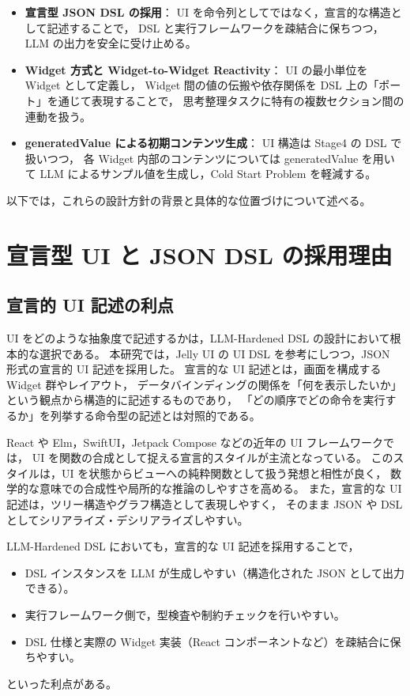 \documentclass[senior,final,11pt,dvipdfmx]{iputit-thesis}
\begin{document}
\begin{itemize}
  \item \textbf{宣言型 JSON DSL の採用}：
        UI を命令列としてではなく，宣言的な構造として記述することで，
        DSL と実行フレームワークを疎結合に保ちつつ，
        LLM の出力を安全に受け止める。
  \item \textbf{Widget 方式と Widget-to-Widget Reactivity}：
        UI の最小単位を Widget として定義し，
        Widget 間の値の伝搬や依存関係を DSL 上の「ポート」を通じて表現することで，
        思考整理タスクに特有の複数セクション間の連動を扱う。
  \item \textbf{generatedValue による初期コンテンツ生成}：
        UI 構造は Stage4 の DSL で扱いつつ，
        各 Widget 内部のコンテンツについては generatedValue を用いて
        LLM によるサンプル値を生成し，Cold Start Problem を軽減する。
\end{itemize}

以下では，これらの設計方針の背景と具体的な位置づけについて述べる。

\section{宣言型 UI と JSON DSL の採用理由}

\subsection{宣言的 UI 記述の利点}

UI をどのような抽象度で記述するかは，LLM-Hardened DSL の設計において根本的な選択である。
本研究では，Jelly UI の UI DSL を参考にしつつ，JSON 形式の宣言的 UI 記述を採用した。
宣言的な UI 記述とは，画面を構成する Widget 群やレイアウト，
データバインディングの関係を「何を表示したいか」という観点から構造的に記述するものであり，
「どの順序でどの命令を実行するか」を列挙する命令型の記述とは対照的である。

React や Elm，SwiftUI，Jetpack Compose などの近年の UI フレームワークでは，
UI を関数の合成として捉える宣言的スタイルが主流となっている。
このスタイルは，UI を状態からビューへの純粋関数として扱う発想と相性が良く，
数学的な意味での合成性や局所的な推論のしやすさを高める。
また，宣言的な UI 記述は，ツリー構造やグラフ構造として表現しやすく，
そのまま JSON や DSL としてシリアライズ・デシリアライズしやすい。

LLM-Hardened DSL においても，宣言的な UI 記述を採用することで，
\begin{itemize}
  \item DSL インスタンスを LLM が生成しやすい（構造化された JSON として出力できる）。
  \item 実行フレームワーク側で，型検査や制約チェックを行いやすい。
  \item DSL 仕様と実際の Widget 実装（React コンポーネントなど）を疎結合に保ちやすい。
\end{itemize}
といった利点がある。
\end{document}
